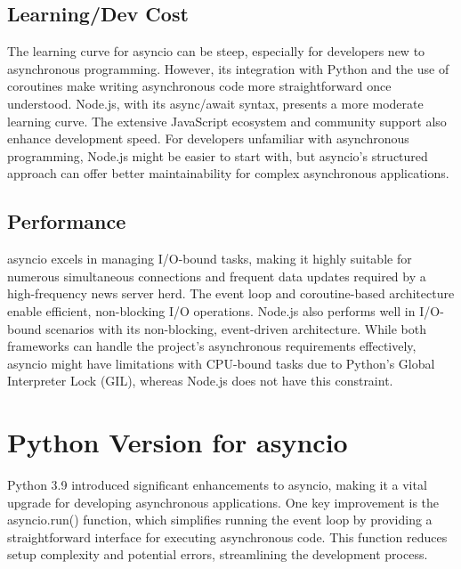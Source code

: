 \documentclass[letterpaper,twocolumn,10pt]{article}
\begin{document}
\subsection{Learning/Dev Cost}
The learning curve for asyncio can be steep, especially for developers new to asynchronous programming. However, its integration with Python and the use of coroutines make writing asynchronous code more straightforward once understood. Node.js, with its async/await syntax, presents a more moderate learning curve. The extensive JavaScript ecosystem and community support also enhance development speed. For developers unfamiliar with asynchronous programming, Node.js might be easier to start with, but asyncio’s structured approach can offer better maintainability for complex asynchronous applications.

\subsection{Performance}
asyncio excels in managing I/O-bound tasks, making it highly suitable for numerous simultaneous connections and frequent data updates required by a high-frequency news server herd. The event loop and coroutine-based architecture enable efficient, non-blocking I/O operations. Node.js also performs well in I/O-bound scenarios with its non-blocking, event-driven architecture. While both frameworks can handle the project’s asynchronous requirements effectively, asyncio might have limitations with CPU-bound tasks due to Python’s Global Interpreter Lock (GIL), whereas Node.js does not have this constraint.

\section{Python Version for asyncio}
Python 3.9 introduced significant enhancements to asyncio, making it a vital upgrade for developing asynchronous applications. One key improvement is the asyncio.run() function, which simplifies running the event loop by providing a straightforward interface for executing asynchronous code. This function reduces setup complexity and potential errors, streamlining the development process.
\vspace{5pt}
\end{document}
